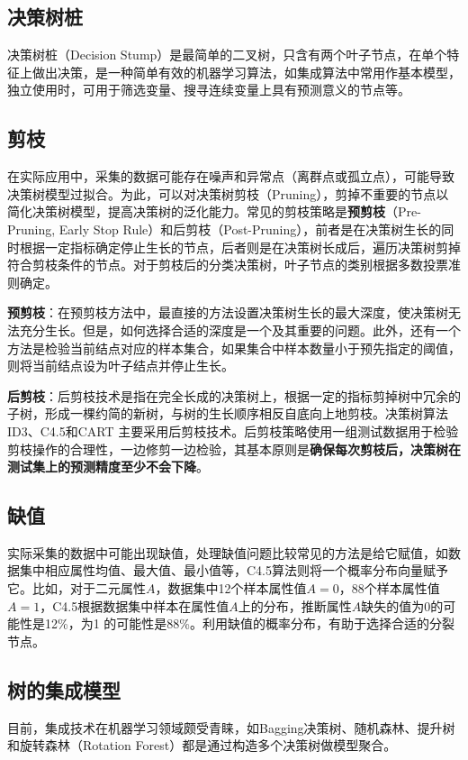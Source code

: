 \subsection{决策树桩}
决策树桩（Decision Stump）是最简单的二叉树，只含有两个叶子节点，在单个特征上做出决策，是一种简单有效的机器学习算法，如集成算法中常用作基本模型，独立使用时，可用于筛选变量、搜寻连续变量上具有预测意义的节点等。

\subsection{剪枝}
在实际应用中，采集的数据可能存在噪声和异常点（离群点或孤立点），可能导致决策树模型过拟合。为此，可以对决策树剪枝（Pruning），剪掉不重要的节点以简化决策树模型，提高决策树的泛化能力。常见的剪枝策略是\textbf{预剪枝}（Pre-Pruning, Early Stop Rule）和后剪枝（Post-Pruning），前者是在决策树生长的同时根据一定指标确定停止生长的节点，后者则是在决策树长成后，遍历决策树剪掉符合剪枝条件的节点。对于剪枝后的分类决策树，叶子节点的类别根据多数投票准则确定。

\textbf{预剪枝}：在预剪枝方法中，最直接的方法设置决策树生长的最大深度，使决策树无法充分生长。但是，如何选择合适的深度是一个及其重要的问题。此外，还有一个方法是检验当前结点对应的样本集合，如果集合中样本数量小于预先指定的阈值，则将当前结点设为叶子结点并停止生长。

\textbf{后剪枝}：后剪枝技术是指在完全长成的决策树上，根据一定的指标剪掉树中冗余的子树，形成一棵约简的新树，与树的生长顺序相反自底向上地剪枝。决策树算法ID3、C4.5和CART 主要采用后剪枝技术。后剪枝策略使用一组测试数据用于检验剪枝操作的合理性，一边修剪一边检验，其基本原则是\textbf{确保每次剪枝后，决策树在测试集上的预测精度至少不会下降}。

\subsection{缺值}
实际采集的数据中可能出现缺值，处理缺值问题比较常见的方法是给它赋值，如数据集中相应属性均值、最大值、最小值等，C4.5算法则将一个概率分布向量赋予它。比如，对于二元属性$A$，数据集中12个样本属性值$A=0$，88个样本属性值$A=1$，C4.5根据数据集中样本在属性值$A$上的分布，推断属性$A$缺失的值为0的可能性是12\%，为1 的可能性是88\%。利用缺值的概率分布，有助于选择合适的分裂节点。

\subsection{树的集成模型}
目前，集成技术在机器学习领域颇受青睐，如Bagging决策树、随机森林、提升树和旋转森林（Rotation Forest）都是通过构造多个决策树做模型聚合。

